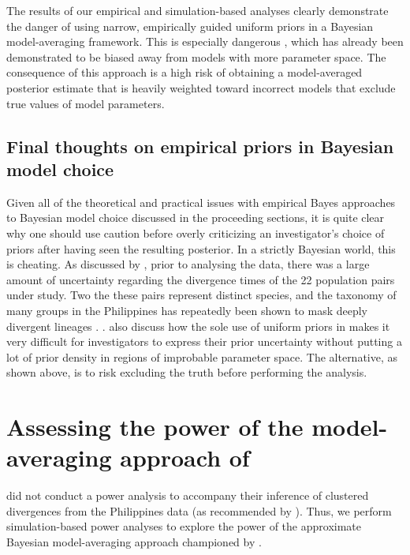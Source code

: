 \documentclass[letterpaper,12pt]{article}
\begin{document}
\begin{linenumbers}
The results of our empirical and simulation-based analyses clearly demonstrate
the danger of using narrow, empirically guided uniform priors in a Bayesian
model-averaging framework.
This is especially dangerous \msb, which has already been demonstrated to be
biased away from models with more parameter space.
The consequence of this approach is a high risk of obtaining a model-averaged
posterior estimate that is heavily weighted toward incorrect models that
exclude true values of model parameters.


\subsection*{Final thoughts on empirical priors in Bayesian model choice}
Given all of the theoretical and practical issues with empirical Bayes
approaches to Bayesian model choice discussed in the proceeding sections, it is
quite clear why one should use caution before overly criticizing an
investigator's choice of priors after having seen the resulting posterior.
In a strictly Bayesian world, this is cheating.
As discussed by \citet{Oaks2012}, prior to analysing the data, there was a large
amount of uncertainty regarding the divergence times of the 22 population pairs
under study.
Two the these pairs represent distinct species, and the taxonomy of many groups
in the Philippines has repeatedly been shown to mask deeply divergent lineages
\citep{RafeDiesmosAlcala2008,Linkem2010,Siler2010,Welton2010,Siler2011HerpMonographs,
Siler2011,Siler2012,RafeStuart2012}.
.
\citet{Oaks2012} also discuss how the sole use of uniform priors in \msb makes
it very difficult for investigators to express their prior uncertainty without
putting a lot of prior density in regions of improbable parameter space.
The alternative, as shown above, is to risk excluding the truth before
performing the analysis.






\section*{Assessing the power of the model-averaging approach of
    \citet{Hickerson2013}}
\citet{Hickerson2013} did not conduct a power analysis to accompany their
inference of clustered divergences from the Philippines data (as recommended by
\citet{Oaks2012}).
Thus, we perform simulation-based power analyses to explore the power of the
approximate Bayesian model-averaging approach championed by
\citet{Hickerson2013}.


\end{linenumbers}
\end{document}
